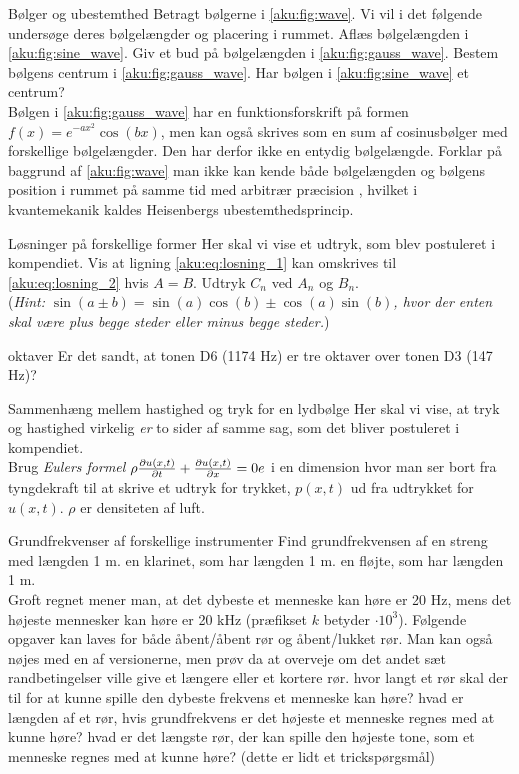 \documentclass[crop=false, class=memoir]{standalone}
\begin{document}
\begin{opgave}[2]{Bølger og ubestemthed}
Betragt bølgerne i \cref{aku:fig:wave}. Vi vil i det følgende undersøge deres bølgelængder og placering i rummet.
\opg Aflæs bølgelængden i \cref{aku:fig:sine_wave}.
\opg Giv et bud på bølgelængden i \cref{aku:fig:gauss_wave}.
\opg Bestem bølgens centrum i \cref{aku:fig:gauss_wave}.
\opg Har bølgen i \cref{aku:fig:sine_wave} et centrum? \\[2mm]
Bølgen i \cref{aku:fig:gauss_wave} har en funktionsforskrift på formen $f(x) = e^{-ax^2}\cos(bx)$, men kan også skrives som en sum af cosinusbølger med forskellige bølgelængder. Den har derfor ikke en entydig bølgelængde.
\opg Forklar på baggrund af \cref{aku:fig:wave} man ikke kan kende både bølgelængden og bølgens position i rummet på samme tid med arbitrær præcision
, hvilket i kvantemekanik kaldes Heisenbergs ubestemthedsprincip.
\end{opgave}
\begin{opgave}[2]{Løsninger på forskellige former}
Her skal vi vise et udtryk, som blev postuleret i kompendiet.
\opg Vis at ligning \eqref{aku:eq:losning_1} kan omskrives til \eqref{aku:eq:losning_2} hvis $A=B$.
\opg Udtryk $C_n$ ved $A_n$ og $B_n$.\\
(\textit{Hint: $\sin(a\pm b)=\sin(a)\cos(b)\pm \cos(a)\sin(b)$, hvor der enten skal være plus begge steder eller minus begge steder.})
\end{opgave}
\begin{opgave}[2]{oktaver}
Er det sandt, at tonen D6 (1174 \si{.Hz}) er tre oktaver over tonen D3 (147 \si{.Hz})?
\end{opgave}
\begin{opgave}[3]{Sammenhæng mellem hastighed og tryk for en lydbølge}
Her skal vi vise, at tryk og hastighed virkelig \textit{er} to sider af samme sag, som det bliver postuleret i kompendiet.\\
Brug \textit{Eulers formel} $\rho \pdv{u(x,t)}{t} + \pdv{u(x,t)}{x}=0e$ i en dimension hvor man ser bort fra tyngdekraft til at skrive et udtryk for trykket, $p(x,t)$ ud fra udtrykket for $u(x,t)$. $\rho$ er densiteten af luft.
\end{opgave}
\begin{opgave}[1]{Grundfrekvenser af forskellige instrumenter}
Find grundfrekvensen af
    \opg en streng med længden 1 \si{.m}.
    \opg en klarinet, som har længden 1 \si{.m}.
    \opg en fløjte, som har længden 1 \si{.m}.\\
Groft regnet mener man, at det dybeste et menneske kan høre er 20 \si{.Hz}, mens det højeste mennesker kan høre er 20 \si{.kHz} (præfikset $k$ betyder $\cdot 10^3$). Følgende opgaver kan laves for både åbent/åbent rør og åbent/lukket rør. Man kan også nøjes med en af versionerne, men prøv da at overveje om det andet sæt randbetingelser ville give et længere eller et kortere rør.
    \opg hvor langt et rør skal der til for at kunne spille den dybeste frekvens et menneske kan høre?
    \opg hvad er længden af et rør, hvis grundfrekvens er det højeste et menneske regnes med at kunne høre?
    \opg hvad er det længste rør, der kan spille den højeste tone, som et menneske regnes med at kunne høre? (dette er lidt et trickspørgsmål)
\end{opgave}
\end{document}
